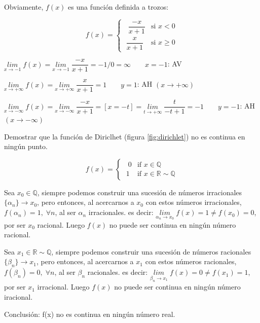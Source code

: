 	\begin{proofw}\renewcommand{\qedsymbol}{$\diamond$}
	
	Obviamente, $f(x)$ es una función definida a trozos:
	
		\begin{equation*}
		f(x)=
		\begin{cases} 
		\;\;  \dfrac {-x}{x+1} &\mbox{si } x< 0 \\ 
		\; \dfrac {x}{x+1} & \mbox{si } x \ge 0 
		\end{cases}
		\end{equation*}
		
		$\underset {x\to -1}{lim}\; {f(x)}= \underset {x\to -1}{lim}\; {\dfrac {-x}{x+1}}=-1/0=\infty \qquad x=-1$: AV
		
		$\underset {x\to +\infty}{lim}\;{f(x)}= \underset {x\to +\infty}{lim}\;{\dfrac {x}{x+1}}=1 \qquad y=1$: AH $(x\to +\infty)$
		
		$\underset {x\to -\infty}{lim}\;{f(x)}= \underset {x\to -\infty}{lim}\;{\dfrac {-x}{x+1}}=[x=-t]=\underset {t\to +\infty}{lim}\;{\dfrac {t}{-t+1}}=-1 \qquad y=-1$: AH $(x\to -\infty)$
		
		
		
	\end{proofw}
	
	\begin{ejre} Demostrar que la función de Diriclhet (figura \ref{fig:dirichlet}) no es continua en ningún punto.
	
	\begin{equation*}
		f(x)=
		\begin{cases} 
		\;\;  0 &\mbox{if } x \in \mathbb{Q} \\ 
		\; 1 & \mbox{if } x \in \mathbb{R} \sim \mathbb{Q} 
		\end{cases}
		\end{equation*}
		
	\end{ejre}

	\begin{proofw}\renewcommand{\qedsymbol}{$\diamond$}
		
		Sea $x_0 \in \mathbb Q$, siempre podemos construir una sucesión de números irracionales $ \{ \alpha_n \} \to x_0$, pero entonces, al acercarnos a $x_0$ con estos números irracionales, $f(\alpha_n)=1, \; \forall n$, al ser $\alpha_n$ irracionales. es decir: $\underset{\alpha_n \to x_0}{lim}\;{f(x)}=1\neq f(x_0)=0$, por ser $x_0$ racional. Luego $f(x)$ no puede ser continua en ningún número racional.
		
		Sea $x_1 \in \mathbb R \sim \mathbb Q$, siempre podemos construir una sucesión de números racionales $ \{ \beta_n \} \to x_1$, pero entonces, al acercarnos a $x_1$ con estos números racionales, $f(\beta_n)=0, \; \forall n$, al ser $\beta_n$ racionales. es decir: $\underset{\beta_n \to x_1}{lim}\;{f(x)}=0\neq f(x_1)=1$, por ser $x_1$ irracional. Luego $f(x)$ no puede ser continua en ningún número iracional.
		
		Conclusión: f(x) no es continua en ningún número real.
		
	\end{proofw}

